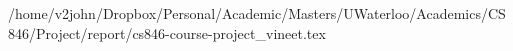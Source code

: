 /home/v2john/Dropbox/Personal/Academic/Masters/UWaterloo/Academics/CS846/Project/report/cs846-course-project_vineet.tex